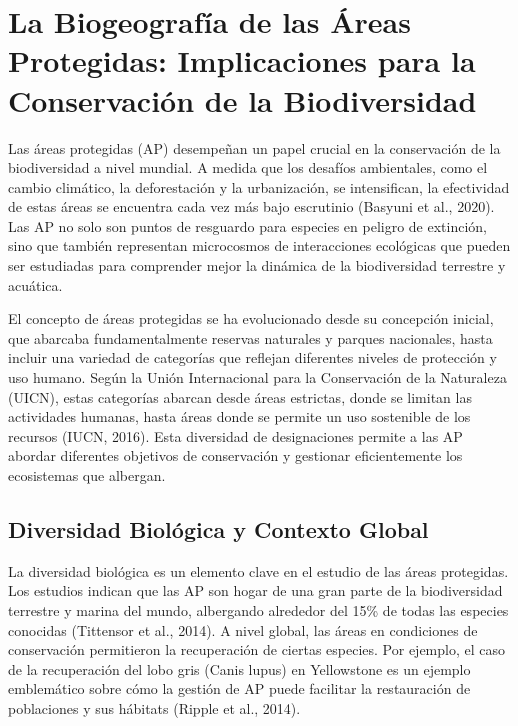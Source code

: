 \documentclass[
  letterpaper,
  DIV=11,
  numbers=noendperiod,
  oneside]{scrreprt}
\begin{document}
\chapter{La Biogeografía de las Áreas Protegidas: Implicaciones para la
Conservación de la
Biodiversidad}\label{la-biogeografuxeda-de-las-uxe1reas-protegidas-implicaciones-para-la-conservaciuxf3n-de-la-biodiversidad}

Las áreas protegidas (AP) desempeñan un papel crucial en la conservación
de la biodiversidad a nivel mundial. A medida que los desafíos
ambientales, como el cambio climático, la deforestación y la
urbanización, se intensifican, la efectividad de estas áreas se
encuentra cada vez más bajo escrutinio (Basyuni et al., 2020). Las AP no
solo son puntos de resguardo para especies en peligro de extinción, sino
que también representan microcosmos de interacciones ecológicas que
pueden ser estudiadas para comprender mejor la dinámica de la
biodiversidad terrestre y acuática.

El concepto de áreas protegidas se ha evolucionado desde su concepción
inicial, que abarcaba fundamentalmente reservas naturales y parques
nacionales, hasta incluir una variedad de categorías que reflejan
diferentes niveles de protección y uso humano. Según la Unión
Internacional para la Conservación de la Naturaleza (UICN), estas
categorías abarcan desde áreas estrictas, donde se limitan las
actividades humanas, hasta áreas donde se permite un uso sostenible de
los recursos (IUCN, 2016). Esta diversidad de designaciones permite a
las AP abordar diferentes objetivos de conservación y gestionar
eficientemente los ecosistemas que albergan.

\section{Diversidad Biológica y Contexto
Global}\label{diversidad-bioluxf3gica-y-contexto-global}

La diversidad biológica es un elemento clave en el estudio de las áreas
protegidas. Los estudios indican que las AP son hogar de una gran parte
de la biodiversidad terrestre y marina del mundo, albergando alrededor
del 15\% de todas las especies conocidas (Tittensor et al., 2014). A
nivel global, las áreas en condiciones de conservación permitieron la
recuperación de ciertas especies. Por ejemplo, el caso de la
recuperación del lobo gris (Canis lupus) en Yellowstone es un ejemplo
emblemático sobre cómo la gestión de AP puede facilitar la restauración
de poblaciones y sus hábitats (Ripple et al., 2014).
\end{document}

